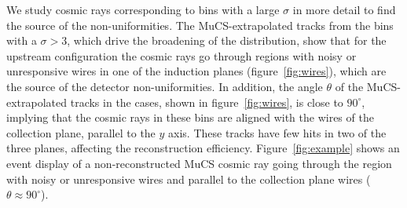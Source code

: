 \documentclass[a4paper,11pt]{article}
\begin{document}
%

 We study cosmic rays corresponding to bins with a large $\sigma$ in more detail to find the source of the non-uniformities. The MuCS-extrapolated tracks from the bins with a $\sigma>3$, which drive the broadening of the distribution, show that for the upstream configuration the cosmic rays go through regions with noisy or unresponsive wires in one of the induction planes (figure~\ref{fig:wires}), which are the source of the detector non-uniformities.
In addition, the angle $\theta$ of the MuCS-extrapolated tracks in the cases, shown in figure~\ref{fig:wires}, is close to $90^\circ$, implying that the cosmic rays in these bins are aligned with the wires of the collection plane, parallel to the $y$ axis. These tracks have few hits in two of the three planes, affecting the reconstruction efficiency. Figure~\ref{fig:example} shows an event display of a non-reconstructed MuCS cosmic ray going through the region with noisy or unresponsive wires and parallel to the collection plane wires ($\theta \approx 90^\circ$).
\end{document}
